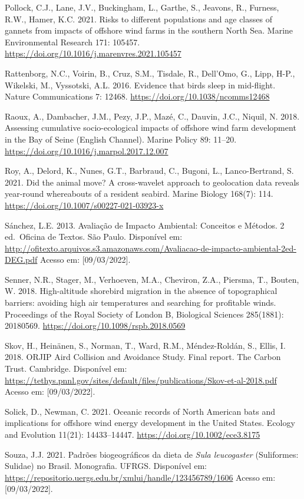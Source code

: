 \documentclass[
  oneside]{scrbook}
\begin{document}
Pollock, C.J., Lane, J.V., Buckingham, L., Garthe, S., Jeavons, R., Furness, R.W., Hamer, K.C. 2021. Risks to different populations and age classes of gannets from impacts of offshore wind farms in the southern North Sea. Marine Environmental Research 171: 105457. \url{https://doi.org/10.1016/j.marenvres.2021.105457}

Rattenborg, N.C., Voirin, B., Cruz, S.M., Tisdale, R., Dell'Omo, G., Lipp, H-P., Wikelski, M., Vyssotski, A.L. 2016. Evidence that birds sleep in mid-flight. Nature Communications 7: 12468. \url{https://doi.org/10.1038/ncomms12468}

Raoux, A., Dambacher, J.M., Pezy, J.P., Mazé, C., Dauvin, J.C., Niquil, N. 2018. Assessing cumulative socio-ecological impacts of offshore wind farm development in the Bay of Seine (English Channel). Marine Policy 89: 11--20. \url{https://doi.org/10.1016/j.marpol.2017.12.007}

Roy, A., Delord, K., Nunes, G.T., Barbraud, C., Bugoni, L., Lanco-Bertrand, S. 2021. Did the animal move? A cross-wavelet approach to geolocation data reveals year-round whereabouts of a resident seabird. Marine Biology 168(7): 114. \url{https://doi.org/10.1007/s00227-021-03923-x}

Sánchez, L.E. 2013. Avaliação de Impacto Ambiental: Conceitos e Métodos. 2 ed.~Oficina de Textos. São Paulo. Disponível em: \url{http://ofitexto.arquivos.s3.amazonaws.com/Avaliacao-de-impacto-ambiental-2ed-DEG.pdf} Acesso em: {[}09/03/2022{]}.

Senner, N.R., Stager, M., Verhoeven, M.A., Cheviron, Z.A., Piersma, T., Bouten, W. 2018. High-altitude shorebird migration in the absence of topographical barriers: avoiding high air temperatures and searching for profitable winds. Proceedings of the Royal Society of London B, Biological Sciences 285(1881): 20180569. \url{https://doi.org/10.1098/rspb.2018.0569}

Skov, H., Heinänen, S., Norman, T., Ward, R.M., Méndez-Roldán, S., Ellis, I. 2018. ORJIP Aird Collision and Avoidance Study. Final report. The Carbon Trust. Cambridge. Disponível em: \url{https://tethys.pnnl.gov/sites/default/files/publications/Skov-et-al-2018.pdf} Acesso em: {[}09/03/2022{]}.

Solick, D., Newman, C. 2021. Oceanic records of North American bats and implications for offshore wind energy development in the United States. Ecology and Evolution 11(21): 14433--14447. \url{https://doi.org/10.1002/ece3.8175}

Souza, J.J. 2021. Padrões biogeográficos da dieta de \emph{Sula leucogaster} (Suliformes: Sulidae) no Brasil. Monografia. UFRGS. Disponível em: \url{https://repositorio.uergs.edu.br/xmlui/handle/123456789/1606} Acesso em: {[}09/03/2022{]}.
\end{document}
